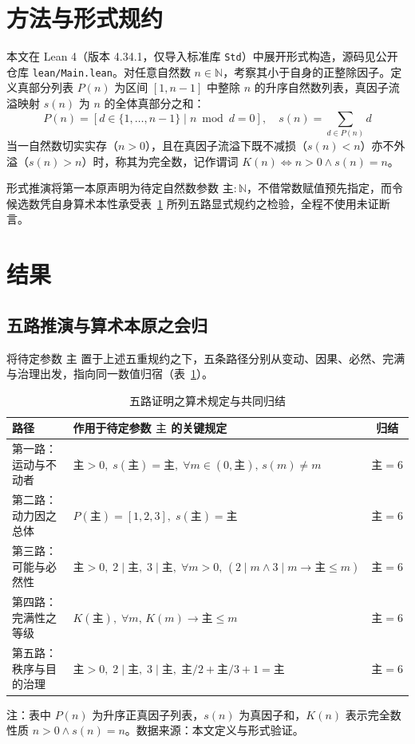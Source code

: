 \documentclass[11pt,a4paper]{ctexart}
\begin{document}
\section{方法与形式规约}

本文在 Lean 4（版本 4.34.1，仅导入标准库 \texttt{Std}）中展开形式构造，源码见公开仓库 \texttt{lean/Main.lean}。对任意自然数 $n \in \mathbb{N}$，考察其小于自身的正整除因子。定义真部分列表 $P(n)$ 为区间 $[1, n-1]$ 中整除 $n$ 的升序自然数列表，真因子流溢映射 $s(n)$ 为 $n$ 的全体真部分之和：
\[
P(n) = [d \in \{1, \dots, n-1\} \mid n \bmod d = 0], \quad s(n) = \sum_{d \in P(n)} d
\]
当一自然数切实实存（$n > 0$），且在真因子流溢下既不减损（$s(n) < n$）亦不外溢（$s(n) > n$）时，称其为完全数，记作谓词 $K(n) \iff n > 0 \land s(n) = n$。

形式推演将第一本原声明为待定自然数参数 $\text{主} : \mathbb{N}$，不借常数赋值预先指定，而令候选数凭自身算术本性承受表~\ref{tab:five_ways} 所列五路显式规约之检验，全程不使用未证断言。

\section{结果}

\subsection{五路推演与算术本原之会归}

将待定参数 $\text{主}$ 置于上述五重规约之下，五条路径分别从变动、因果、必然、完满与治理出发，指向同一数值归宿（表~\ref{tab:five_ways}）。

\begin{table}[htbp]
  \centering
  \caption{五路证明之算术规定与共同归结}
  \label{tab:five_ways}
  \small
  \begin{tabularx}{\textwidth}{>{\raggedright\arraybackslash}p{3.4cm} >{\raggedright\arraybackslash}X c}
    \toprule
    路径 & 作用于待定参数 $\text{主}$ 的关键规定 & 归结 \\
    \midrule
    第一路：运动与不动者 & $\text{主}>0,\; s(\text{主})=\text{主},\; \forall m\in(0,\text{主}),\, s(m)\neq m$ & $\text{主} = 6$ \\
    第二路：动力因之总体 & $P(\text{主})=[1,2,3],\; s(\text{主})=\text{主}$ & $\text{主} = 6$ \\
    第三路：可能与必然性 & $\text{主}>0,\; 2\mid\text{主},\; 3\mid\text{主},\; \forall m>0,\, (2\mid m \land 3\mid m \to \text{主}\le m)$ & $\text{主} = 6$ \\
    第四路：完满性之等级 & $K(\text{主}),\; \forall m,\, K(m)\to \text{主}\le m$ & $\text{主} = 6$ \\
    第五路：秩序与目的治理 & $\text{主}>0,\; 2\mid\text{主},\; 3\mid\text{主},\; \text{主}/2+\text{主}/3+1=\text{主}$ & $\text{主} = 6$ \\
    \bottomrule
  \end{tabularx}
  \par\vspace{0.4em}
  {\footnotesize\raggedright 注：表中 $P(n)$ 为升序正真因子列表，$s(n)$ 为真因子和，$K(n)$ 表示完全数性质 $n>0 \land s(n)=n$。数据来源：本文定义与形式验证。\par}
\end{table}
\end{document}
